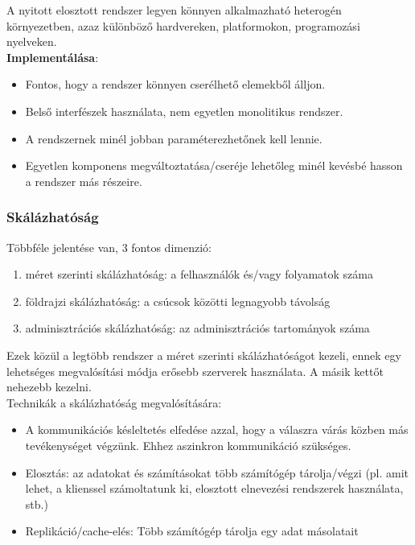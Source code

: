 \documentclass[margin=0px]{article}
\begin{document}
	\noindent A nyitott elosztott rendszer legyen könnyen alkalmazható heterogén környezetben, azaz
	különböző hardvereken, platformokon, programozási nyelveken.\\
	
	\noindent \textbf{Implementálása}:
	
	\begin{itemize}
		\item	Fontos, hogy a rendszer könnyen cserélhető elemekből álljon.
		\item	Belső interfészek használata, nem egyetlen monolitikus rendszer.
		\item	A rendszernek minél jobban paraméterezhetőnek kell lennie.
		\item	Egyetlen komponens megváltoztatása/cseréje lehetőleg minél kevésbé
		hasson a rendszer más részeire.
	\end{itemize}
	
	\subsubsection{Skálázhatóság}
	
	Többféle jelentése van, 3 fontos dimenzió:
	
	\begin{enumerate}
		\item	méret szerinti skálázhatóság: a felhasználók és/vagy folyamatok száma
		\item	földrajzi skálázhatóság: a csúcsok közötti legnagyobb távolság
		\item	adminisztrációs skálázhatóság: az adminisztrációs tartományok száma
	\end{enumerate}
	
	Ezek közül a legtöbb rendszer a méret szerinti skálázhatóságot kezeli, ennek egy lehetséges megvalósítási
	módja erősebb szerverek használata. A másik kettőt nehezebb kezelni.\\
	
	\noindent Technikák a skálázhatóság megvalósítására:
	
	\begin{itemize}
		\item	A kommunikációs késleltetés elfedése azzal, hogy a válaszra várás közben más tevékenységet végzünk. Ehhez
		aszinkron kommunikáció szükséges.
		
		\item	Elosztás: az adatokat és számításokat több számítógép tárolja/végzi (pl. amit lehet, a klienssel számoltatunk ki,
		elosztott elnevezési rendszerek használata, stb.)
		
		\item	Replikáció/cache-elés:  Több számítógép tárolja egy adat másolatait
	\end{itemize}
	
\end{document}
